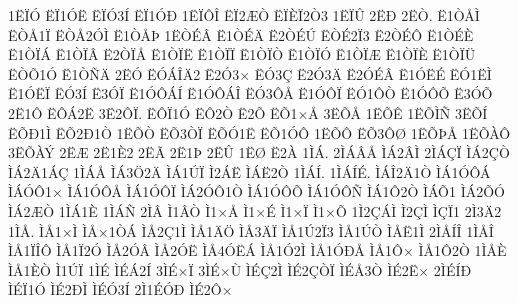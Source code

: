 {1^^cb^^cf^^d3
^^cb^^cf1^^d3^^cb
^^cb^^cf^^d33^^cd
^^cb^^cf1^^d3^^d0
1^^cb^^cf^^d4^^ce
^^cb^^cf2^^c6^^d2
^^cb^^cf^^c8^^cf2^^d23
1^^cb^^cf^^db
2^^cb^^d0
2^^cb^^d2.
^^cb1^^d2^^c5^^cc
^^cb^^d2^^c51^^cf
^^cb^^d2^^c52^^d3^^cc
^^cb1^^d2^^c5^^de
1^^cb^^d2^^c9^^c2
^^cb1^^d2^^c9^^c4
^^cb2^^d2^^c9^^da
^^cb^^d2^^c92^^cf3
^^cb2^^d2^^c9^^d4
^^cb1^^d2^^c9^^c8
^^cb1^^d2^^cf^^c1
^^cb1^^d2^^cf^^c2
^^cb2^^d2^^cf^^c5
^^cb1^^d2^^cf^^cb
^^cb1^^d2^^cf^^cf
^^cb1^^d2^^cf^^d2
^^cb1^^d2^^cf^^d3
^^cb1^^d2^^cf^^c6
^^cb1^^d2^^cf^^c8
^^cb1^^d2^^cf^^dc
^^cb^^d2^^d51^^d3
^^cb1^^d2^^d1^^c4
2^^cb^^d3
^^cb^^d3^^c1^^ce^^c42
^^cb2^^d33^^d7
^^cb^^d33^^c7
^^cb2^^d33^^c4
^^cb2^^d3^^c9^^c2
^^cb1^^d3^^cb^^c9
^^cb^^d31^^cb^^cc
^^cb1^^d3^^cb^^cf
^^cb^^d33^^cd
^^cb3^^d3^^cf
^^cb1^^d3^^d4^^c1^^cd
^^cb1^^d3^^d4^^c1^^ce
^^cb^^d33^^d4^^c5
^^cb1^^d3^^d4^^cf
^^cb^^d31^^d4^^d2
^^cb1^^d3^^d4^^d5
^^cb3^^d3^^d5
2^^cb1^^d4
^^cb^^d4^^c12^^cb
3^^cb2^^d4^^cf.
^^cb^^d4^^cf1^^d3
^^cb^^d42^^d2
^^cb2^^d5
^^cb^^d51^^d7^^c5
3^^cb^^d5^^c5
1^^cb^^d5^^ca
1^^cb^^d5^^cc^^d1
3^^cb^^d5^^cd
^^cb^^d5^^d01^^cc
^^cb^^d52^^d01^^d2
1^^cb^^d5^^d2
^^cb^^d53^^d2^^cf
^^cb^^d5^^d31^^cb
^^cb^^d51^^d3^^d4
1^^cb^^d5^^d4
^^cb^^d53^^d4^^d8
1^^cb^^d5^^de^^c5
1^^cb^^d5^^c0^^d4
3^^cb^^d5^^c0^^dd
2^^cb^^c6
2^^cb1^^c82
2^^cb^^c3
2^^cb1^^de
2^^cb^^db
1^^cb^^d8
^^cb2^^c0
1^^cc^^c1.
2^^cc^^c1^^c2^^c5
^^cc^^c12^^c2^^cc
2^^cc^^c1^^c7^^cf
^^cc^^c12^^c7^^d2
^^cc^^c12^^c41^^c1^^c7
1^^cc^^c1^^c5
^^cc^^c13^^d62^^c4
^^cc^^c11^^da^^cf
^^cc2^^c1^^cb
^^cc^^c1^^cb2^^d2
1^^cc^^c1^^cd.
1^^cc^^c1^^cd^^c9.
^^cc^^c1^^ce2^^c41^^d2
^^cc^^c11^^d3^^d4^^c1
^^cc^^c1^^d3^^d41^^d7
^^cc^^c11^^d3^^d4^^c5
^^cc^^c11^^d3^^d4^^cf
^^cc^^c12^^d3^^d41^^d2
^^cc^^c11^^d3^^d4^^d5
^^cc^^c11^^d3^^d4^^d1
^^cc^^c11^^d42^^d2
^^cc^^c1^^d51
^^cc^^c12^^d5^^d3
^^cc^^c12^^c6^^d2
1^^cc^^c11^^c8
1^^cc^^c1^^d1
2^^cc^^c2
^^cc1^^c2^^d2
^^cc1^^d7^^c5
^^cc1^^d7^^c9
^^cc1^^d7^^cf
^^cc1^^d7^^d5
1^^cc2^^c7^^c1^^cc
^^cc2^^c7^^cc
^^cc^^c7^^cf1
2^^cc3^^c42
1^^cc^^c5.
^^cc^^c51^^d7^^cc
^^cc^^c5^^d71^^d2^^c1
^^cc^^c52^^c71^^cc
^^cc^^c51^^c4^^d6
^^cc^^c53^^c4^^cf
^^cc^^c51^^da2^^cf3
^^cc^^c51^^da^^d2
^^cc^^c5^^cb1^^cc
2^^cc^^c5^^cd^^ce
1^^cc^^c5^^ce
^^cc^^c51^^cf^^ce^^d4
^^cc^^c51^^cf2^^d3
^^cc^^c52^^d3^^c2
^^cc^^c52^^d3^^cb
^^cc^^c54^^d3^^cb^^c1
^^cc^^c51^^d32^^cc
^^cc^^c51^^d3^^d0^^c5
^^cc^^c51^^d4^^d7
^^cc^^c51^^d42^^d2
1^^cc^^c5^^c8
^^cc^^c51^^c8^^d2
^^cc1^^da^^cf
1^^cc^^c9
^^cc^^c9^^c12^^cd
3^^cc^^c9^^d7^^cf
3^^cc^^c9^^d7^^d9
^^cc^^c9^^c72^^cc
^^cc^^c92^^c7^^d2^^cf
^^cc^^c9^^c53^^d2
^^cc^^c92^^cb^^d7
2^^cc^^c9^^cd^^d0
^^cc^^c9^^cf1^^d3
^^cc^^c92^^d0^^cc
^^cc^^c9^^d33^^cd
2^^cc1^^c9^^d3^^d0
^^cc^^c92^^d4^^d7
}
